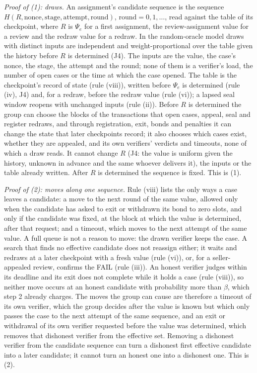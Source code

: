 \documentclass[10pt,a4paper]{article}
\theoremstyle{plain}
\theoremstyle{remark}
\begin{document}
\emph{Proof of (1): draws.} An assignment's candidate sequence is the sequence $H(R,\mathrm{nonce},\mathrm{stage},\mathrm{attempt},\mathrm{round})$, $\mathrm{round}=0,1,\dots$, read against the table of its checkpoint, where $R$ is $\Psi_e$ for a first assignment, the review-assignment value for a review and the redraw value for a redraw. In the random-oracle model draws with distinct inputs are independent and weight-proportional over the table given the history before $R$ is determined (J4). The inputs are the value, the case's nonce, the stage, the attempt and the round; none of them is a verifier's load, the number of open cases or the time at which the case opened. The table is the checkpoint's record of state (rule (viii)), written before $\Psi_e$ is determined (rule (iv), J4) and, for a redraw, before the redraw value (rule (vi)); a lapsed seal window reopens with unchanged inputs (rule (ii)). Before $R$ is determined the group can choose the blocks of the transactions that open cases, appeal, seal and register redraws, and through registration, exit, bonds and penalties it can change the state that later checkpoints record; it also chooses which cases exist, whether they are appealed, and its own verifiers' verdicts and timeouts, none of which a draw reads. It cannot change $R$ (J4: the value is uniform given the history, unknown in advance and the same whoever delivers it), the inputs or the table already written. After $R$ is determined the sequence is fixed. This is (1).

\emph{Proof of (2): moves along one sequence.} Rule (viii) lists the only ways a case leaves a candidate: a move to the next round of the same value, allowed only when the candidate has asked to exit or withdrawn its bond to zero slots, and only if the candidate was fixed, at the block at which the value is determined, after that request; and a timeout, which moves to the next attempt of the same value. A full queue is not a reason to move: the drawn verifier keeps the case. A search that finds no effective candidate does not reassign either; it waits and redraws at a later checkpoint with a fresh value (rule (vi)), or, for a seller-appealed review, confirms the FAIL (rule (iii)). An honest verifier judges within its deadline and its exit does not complete while it holds a case (rule (viii)), so neither move occurs at an honest candidate with probability more than $\beta$, which step 2 already charges. The moves the group can cause are therefore a timeout of its own verifier, which the group decides after the value is known but which only passes the case to the next attempt of the same sequence, and an exit or withdrawal of its own verifier requested before the value was determined, which removes that dishonest verifier from the effective set. Removing a dishonest verifier from the candidate sequence can turn a dishonest first effective candidate into a later candidate; it cannot turn an honest one into a dishonest one. This is (2).
\end{document}
